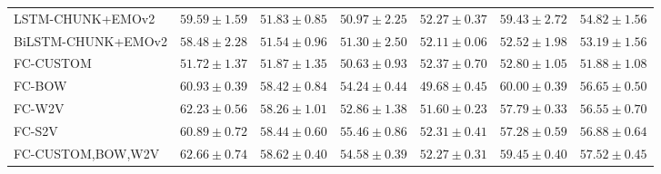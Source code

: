 \documentclass[10pt, a4paper]{article}
\begin{document}
\begin{table*}
\begin{center}
{\begin{tabular}{l|ccccc|c}
LSTM-CHUNK+EMOv2 & $59.59 \pm 1.59$ & $51.83 \pm 0.85$ & $50.97 \pm 2.25$ & $52.27 \pm 0.37$ & $59.43 \pm 2.72$ & $54.82 \pm 1.56$ \\
BiLSTM-CHUNK+EMOv2 & $58.48 \pm 2.28$ & $51.54 \pm 0.96$ & $51.30 \pm 2.50$ & $52.11 \pm 0.06$ & $52.52 \pm 1.98$ & $53.19 \pm 1.56$ \\ \midrule
FC-CUSTOM & $51.72 \pm 1.37$ & $51.87 \pm 1.35$ & $50.63 \pm 0.93$ & $52.37 \pm 0.70$ & $52.80 \pm 1.05$ & $51.88 \pm 1.08$ \\
FC-BOW & $60.93 \pm 0.39$ & $58.42 \pm 0.84$ & $54.24 \pm 0.44$ & $49.68 \pm 0.45$ & $60.00 \pm 0.39$ & $56.65 \pm 0.50$ \\
FC-W2V & $62.23 \pm 0.56$ & $58.26 \pm 1.01$ & $52.86 \pm 1.38$ & $51.60 \pm 0.23$ & $57.79 \pm 0.33$ & $56.55 \pm 0.70$ \\
FC-S2V & $60.89 \pm 0.72$ & $58.44 \pm 0.60$ & $55.46 \pm 0.86$ & $52.31 \pm 0.41$ & $57.28 \pm 0.59$ & $56.88 \pm 0.64$ \\
FC-CUSTOM,BOW,W2V & $62.66 \pm 0.74$ & $58.62 \pm 0.40$ & $54.58 \pm 0.39$ & $52.27 \pm 0.31$ & $59.45 \pm 0.40$ & $57.52 \pm 0.45$ \\
\bottomrule
\end{tabular}}
\end{center}
\end{table*}
\end{document}
